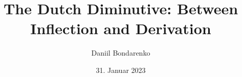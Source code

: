 
\title{The Dutch Diminutive: Between Inflection and Derivation} 
\newcommand{\Year}{2023}
\date{31. Januar \Year}
\newcommand{\thesisKind}{Bachelor}
\newcommand{\degree}{Bachelor~of~Arts~(B.A.)}
\newcommand{\versionnumber}{1}

\author{Daniil Bondarenko}
\newcommand{\matrikelno}{575836}
\newcommand{\email}{bondared@hu-berlin.de}

\newcommand{\fstAdvisor}{Prof.~Dr.~Dr.~h.c.~Artemis~Alexiadou}
\newcommand{\fstAdvisorsUniversity}{Humboldt-Universität zu Berlin} 
\newcommand{\fstAdvisorsDepartment}{Sprach- und literaturwissenschaftliche Fakultät} 
\newcommand{\fstAdvisorsAG}{Institut für Anglistik und Amerikanistik}
\newcommand{\fstAdvisorsCountry}{Deutschland}

\newcommand{\sndAdvisor}{Prof.~Dr.~Markus~Egg}
\newcommand{\sndAdvisorsUniversity}{Humboldt-Universität zu Berlin} %
\newcommand{\sndAdvisorsDepartment}{Sprach- und literaturwissenschaftliche Fakultät}
\newcommand{\sndAdvisorsAG}{Institut für Anglistik und Amerikanistik}
\newcommand{\sndAdvisorsCountry}{Deutschland}












